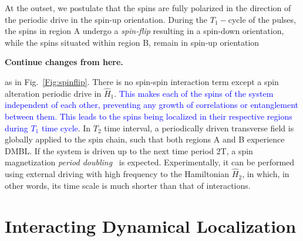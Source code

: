 \documentclass[%
nofootinbib,
reprint,
superscriptaddress,
amsmath,amssymb,showkeys,
aps,
prb,
]{revtex4-2}
\newcommand{\blue}[1]{\textcolor{blue}{#1}}
\begin{document}
	At the outset, we postulate that the spins are fully polarized in the direction of the periodic drive in the spin-up orientation. During the $T_1-$cycle of the pulses,  the spins in region A undergo a \textit{spin-flip} resulting in a spin-down orientation, while the spins situated within region B, remain in spin-up orientation 
	
	\textbf{Continue changes from here.}
	
	as in Fig.~\ref{Fig:spinflip}. There is no spin-spin interaction term except a spin alteration periodic drive in $\hat{H}_1$. \blue{This makes each of the spins of the system independent of each other, preventing any growth of correlations or entanglement between them. This leads to the spins being localized in their respective regions during $T_1$ time cycle}. In $T_2$ time interval, a periodically driven transverse field is globally applied to the spin chain, such that both regions A and B experience DMBL. If the system is driven up to the next time period 2T, a spin magnetization \textit{period doubling}~\cite{rovny_31mathrmp_2018, Pan2020} is expected. Experimentally, it can be performed using external driving with high frequency to the Hamiltonian $\hat{H}_2$, in which, in other words, its time scale is much shorter than that of interactions.~\cite{choi_observation_2017,zhang_observation_2017,Cirac_1995,Blatt_2012}
	
	\section{\label{sec:level2} Interacting Dynamical Localization}
	
\end{document}

